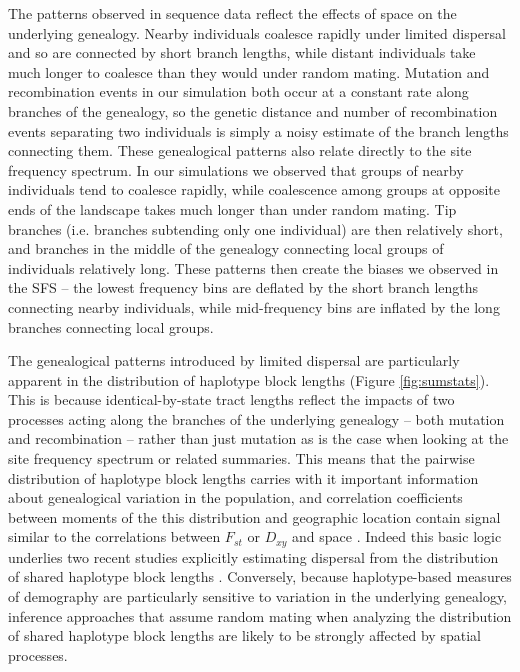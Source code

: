 \documentclass[11pt,twoside,lineno]{preprint}
\begin{document}
The patterns observed in sequence data reflect the effects of space on the underlying genealogy. Nearby individuals coalesce rapidly under limited dispersal and so are connected by short branch lengths, while distant individuals take much longer to coalesce than they would under random mating. Mutation and recombination events in our simulation both occur at a constant rate along branches of the genealogy, so the genetic distance and number of recombination events separating two individuals is simply a noisy estimate of the branch lengths connecting them. These genealogical patterns also relate directly to the site frequency spectrum. In our simulations we observed that groups of nearby individuals tend to coalesce rapidly, while coalescence among groups at opposite ends of the landscape takes much longer than under random mating. Tip branches (i.e. branches subtending only one individual) are then relatively short, and branches in the middle of the genealogy connecting local groups of individuals relatively long. These patterns then create the biases we observed in the SFS -- the lowest frequency bins are deflated by the short branch lengths connecting nearby individuals, while mid-frequency bins are inflated by the long branches connecting local groups. 

The genealogical patterns introduced by limited dispersal are particularly apparent in the distribution of haplotype block lengths (Figure \ref{fig:sumstats}). This is because identical-by-state tract lengths reflect the impacts of two processes acting along the branches of the underlying genealogy -- both mutation and recombination -- rather than just mutation as is the case when looking at the site frequency spectrum or related summaries. This means that the pairwise distribution of haplotype block lengths carries with it important information about genealogical variation in the population, and correlation coefficients between moments of the this distribution and geographic location contain signal similar to the correlations between $F_{st}$ or $D_{xy}$ and space \citep{Rousset1997}. Indeed this basic logic underlies two recent studies explicitly estimating dispersal from the distribution of shared haplotype block lengths \citep{Ringbauer2017,Baharian2016}. Conversely, because haplotype-based measures of demography are particularly sensitive to variation in the underlying genealogy, inference approaches that assume random mating when analyzing the distribution of shared haplotype block lengths are likely to be strongly affected by spatial processes. 
\end{document}
